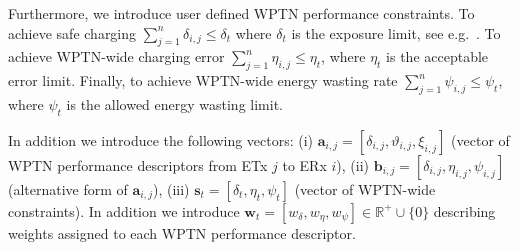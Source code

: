 \documentclass[11pt,draftclsnofoot,journal,onecolumn]{IEEEtran}
\begin{document}
Furthermore, we introduce user defined WPTN performance constraints. To achieve safe charging $\sum\nolimits_{j = 1}^n \delta _{i,j}\leq \delta_t$ where $\delta_t$ is the exposure limit, see e.g.~\cite[Sec. III-B]{dai_infocom_2014}. To achieve WPTN-wide charging error $\sum\nolimits_{j = 1}^n \eta _{i,j}\leq \eta_t$, where $\eta_t$ is the acceptable error limit. Finally, to achieve WPTN-wide energy wasting rate $\sum\nolimits_{j = 1}^n \psi _{i,j}\leq \psi_t$, where $\psi_t$ is the allowed energy wasting limit.

In addition we introduce the following vectors: (i) $\mathbf{a}_{i,j} = [\delta_{i,j}, \vartheta_{i,j}, \xi_{i,j}]$ (vector of WPTN performance descriptors from ETx $j$ to ERx $i$), (ii) $\mathbf{b}_{i,j} = [\delta_{i,j} ,\eta_{i,j} ,\psi_{i,j}]$ (alternative form of $\mathbf{a}_{i,j}$), (iii) $\mathbf{s}_{t} = [\delta_t ,\eta_t ,\psi_t]$ (vector of WPTN-wide constraints). In addition we introduce $\mathbf{w}_{t}=[w_{\delta},w_{\eta},w_{\psi}]\in\mathbb{R}^{+}\cup\{0\}$ describing weights assigned to each WPTN performance descriptor.
\end{document}
